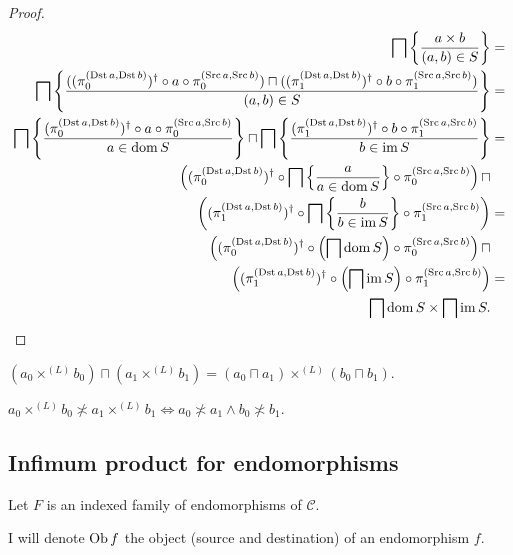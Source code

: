 \begin{proof}
  ~
  \begin{align*}
  \bigsqcap \left\{ \frac{ a \times b }{ (a , b) \in S }\right\} & = \\
  \bigsqcap \left\{ \frac{ ((\pi^{(\operatorname{Dst} a , \operatorname{Dst}
  b)}_0)^{\dagger} \circ a \circ \pi^{(\operatorname{Src} a , \operatorname{Src} b)}_0) \sqcap
  ((\pi^{(\operatorname{Dst} a , \operatorname{Dst} b)}_1)^{\dagger} \circ b \circ
  \pi^{(\operatorname{Src} a , \operatorname{Src} b)}_1) }{ (a , b) \in S }\right\} & = \\
  \bigsqcap \left\{ \frac{ (\pi^{(\operatorname{Dst} a , \operatorname{Dst}
  b)}_0)^{\dagger} \circ a \circ \pi^{(\operatorname{Src} a , \operatorname{Src} b)}_0
  }{ a \in \operatorname{dom} S }\right\} \sqcap
  \bigsqcap
  \left\{ \frac{ (\pi^{(\operatorname{Dst} a , \operatorname{Dst} b)}_1)^{\dagger} \circ b \circ
  \pi^{(\operatorname{Src} a , \operatorname{Src} b)}_1 }{ b \in \operatorname{im} S }\right\} & = \\
  \left( (\pi^{(\operatorname{Dst} a , \operatorname{Dst}
  b)}_0)^{\dagger} \circ \bigsqcap \left\{ \frac{ a }{ a \in
  \operatorname{dom} S }\right\} \circ \pi^{(\operatorname{Src} a , \operatorname{Src} b)}_0 \right)
  \sqcap\\ \left( (\pi^{(\operatorname{Dst} a , \operatorname{Dst} b)}_1)^{\dagger} \circ
  \bigsqcap \left\{ \frac{ b }{ b \in \operatorname{im} S }\right\}
  \circ \pi^{(\operatorname{Src} a , \operatorname{Src} b)}_1 \right) & = \\
  \left(
  (\pi^{(\operatorname{Dst} a , \operatorname{Dst} b)}_0)^{\dagger} \circ \left( \bigsqcap
  \operatorname{dom} S \right) \circ \pi^{(\operatorname{Src} a , \operatorname{Src} b)}_0 \right)
  \sqcap\\ \left( (\pi^{(\operatorname{Dst} a , \operatorname{Dst} b)}_1)^{\dagger} \circ \left(
  \bigsqcap \operatorname{im} S \right) \circ \pi^{(\operatorname{Src} a , \operatorname{Src} b)}_1
  \right) & = \\
  \bigsqcap \operatorname{dom} S \times \bigsqcap \operatorname{im} S.
  \end{align*}
\end{proof}

\begin{cor}
  $(a_0 \times^{(L)} b_0) \sqcap (a_1 \times^{(L)} b_1) = (a_0 \sqcap a_1)
  \times^{(L)} (b_0 \sqcap b_1)$.
\end{cor}

\begin{cor}
  $a_0 \times^{(L)} b_0 \nasymp a_1 \times^{(L)} b_1 \Leftrightarrow a_0
  \nasymp a_1 \wedge b_0 \nasymp b_1$.
\end{cor}

\subsection{Infimum product for endomorphisms}

Let $F$ is an indexed family of endomorphisms of $\mathcal{C}$.

I will denote $\operatorname{Ob} f$ the object (source and destination) of an
endomorphism $f$.

